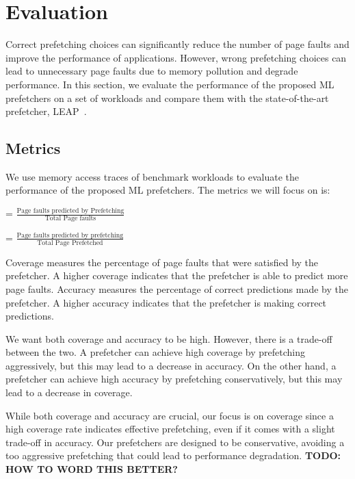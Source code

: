 
\section{Evaluation}
\label{sec:5}

Correct prefetching choices can significantly reduce the number of page faults and improve the performance of applications. However, wrong prefetching choices can lead to unnecessary page faults due to memory pollution and degrade performance. In this section, we evaluate the performance of the proposed ML prefetchers on a set of workloads and compare them with the state-of-the-art prefetcher, LEAP~\cite{leap}.

\subsection{Metrics}

We use memory access traces of benchmark workloads to evaluate the performance of the proposed ML prefetchers. The metrics we will focus on is:

\begin{definition}
     = $\frac{\text{Page faults predicted by Prefetching}}{\text{Total Page faults}}$
\end{definition}

\begin{definition}
     = $\frac{\text{Page faults predicted by prefetching}}{\text{Total Page Prefetched}}$
\end{definition}


Coverage measures the percentage of page faults that were satisfied by the prefetcher. A higher coverage indicates that the prefetcher is able to predict more page faults. Accuracy measures the percentage of correct predictions made by the prefetcher. A higher accuracy indicates that the prefetcher is making correct predictions.

We want both coverage and accuracy to be high. However, there is a trade-off between the two. A prefetcher can achieve high coverage by prefetching aggressively, but this may lead to a decrease in accuracy. On the other hand, a prefetcher can achieve high accuracy by prefetching conservatively, but this may lead to a decrease in coverage. 

While both coverage and accuracy are crucial, our focus is on coverage since a high coverage rate indicates effective prefetching, even if it comes with a slight trade-off in accuracy. Our prefetchers are designed to be conservative, avoiding a too aggressive prefetching that could lead to performance degradation. \textbf{TODO: HOW TO WORD THIS BETTER?}

